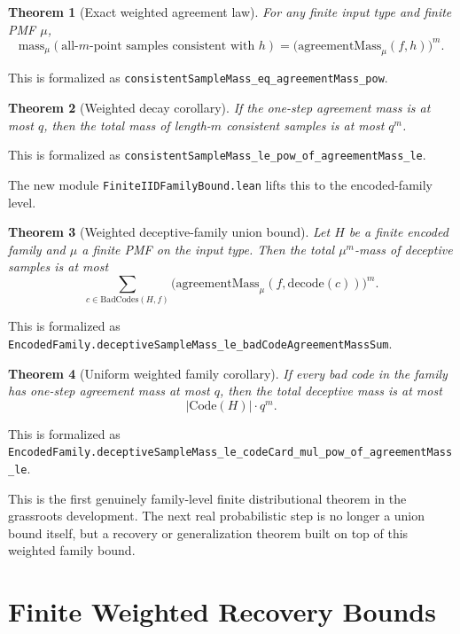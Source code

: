 \documentclass[11pt]{article}
\newtheorem{theorem}{Theorem}[section]
\theoremstyle{remark}
\begin{document}
\begin{theorem}[Exact weighted agreement law]
For any finite input type and finite PMF \(\mu\),
\[
  \mathrm{mass}_{\mu}(\text{all-$m$-point samples consistent with } h)
  =
  \bigl(\mathrm{agreementMass}_{\mu}(f,h)\bigr)^m.
\]
\end{theorem}

\noindent
This is formalized as
\texttt{consistentSampleMass\_eq\_agreementMass\_pow}.

\begin{theorem}[Weighted decay corollary]
If the one-step agreement mass is at most \(q\), then the total mass of
length-\(m\) consistent samples is at most \(q^m\).
\end{theorem}

\noindent
This is formalized as
\texttt{consistentSampleMass\_le\_pow\_of\_agreementMass\_le}.

The new module \texttt{FiniteIIDFamilyBound.lean} lifts this to the encoded-family
level.

\begin{theorem}[Weighted deceptive-family union bound]
Let \(H\) be a finite encoded family and \(\mu\) a finite PMF on the input type.
Then the total \(\mu^m\)-mass of deceptive samples is at most
\[
  \sum_{c \in \mathrm{BadCodes}(H,f)}
    \bigl(\mathrm{agreementMass}_{\mu}(f,\mathrm{decode}(c))\bigr)^m.
\]
\end{theorem}

\noindent
This is formalized as
\texttt{EncodedFamily.deceptiveSampleMass\_le\_badCodeAgreementMassSum}.

\begin{theorem}[Uniform weighted family corollary]
If every bad code in the family has one-step agreement mass at most \(q\), then
the total deceptive mass is at most
\[
  |\mathrm{Code}(H)| \cdot q^m.
\]
\end{theorem}

\noindent
This is formalized as
\texttt{EncodedFamily.deceptiveSampleMass\_le\_codeCard\_mul\_pow\_of\_agreementMass\_le}.

This is the first genuinely family-level finite distributional theorem in the
grassroots development.  The next real probabilistic step is no longer a union
bound itself, but a recovery or generalization theorem built on top of this
weighted family bound.

\section{Finite Weighted Recovery Bounds}
\end{document}
